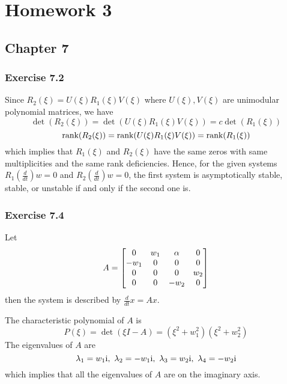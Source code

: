 
\section{Homework 3}

\subsection{Chapter 7}
\subsubsection{Exercise 7.2}
Since $R_2(\xi) = U(\xi)R_1(\xi)V(\xi)$ where $U(\xi),V(\xi)$ are unimodular polynomial matrices, we have
\begin{equation}
    \det(R_2(\xi)) = \det(U(\xi)R_1(\xi)V(\xi)) = c\det(R_1(\xi))
\end{equation}
\begin{equation}
    \textnormal{rank}(R_2(\xi)) = \textnormal{rank}(U(\xi)R_1(\xi)V(\xi)) = \textnormal{rank}(R_1(\xi))
\end{equation}
which implies that $R_1(\xi)$ and $R_2(\xi)$ have the same zeros with same multiplicities and the same rank deficiencies. Hence, for the given systems $R_1(\frac{d}{dt})w=0$ and $R_2(\frac{d}{dt})w=0$, the first system is asymptotically
stable, stable, or unstable if and only if the second one is.


\subsubsection{Exercise 7.4}
Let 
\begin{equation}
    A = \begin{bmatrix} 
    0       &w_1    &\alpha     &0 \\
    -w_1    &0      &0          &0 \\
    0       &0      &0          &w_2\\
    0       &0      &-w_2       &0
    \end{bmatrix}
\end{equation}
then the system is described by $\frac{d}{dt}x = Ax$.

The characteristic polynomial of $A$ is
\begin{equation}
    P(\xi) = \det(\xi I-A) = (\xi^2+w_1^2)(\xi^2+w_2^2)
\end{equation}
 The eigenvalues of $A$ are
 \begin{equation}\label{eq:7.4eig}
     \lambda_1 = w_1\textnormal{i}, ~\lambda_2 = -w_1\textnormal{i}, ~\lambda_3 = w_2\textnormal{i}, ~\lambda_4 = -w_2\textnormal{i}
 \end{equation}
which implies that all the eigenvalues of $A$ are on the imaginary axis. 

